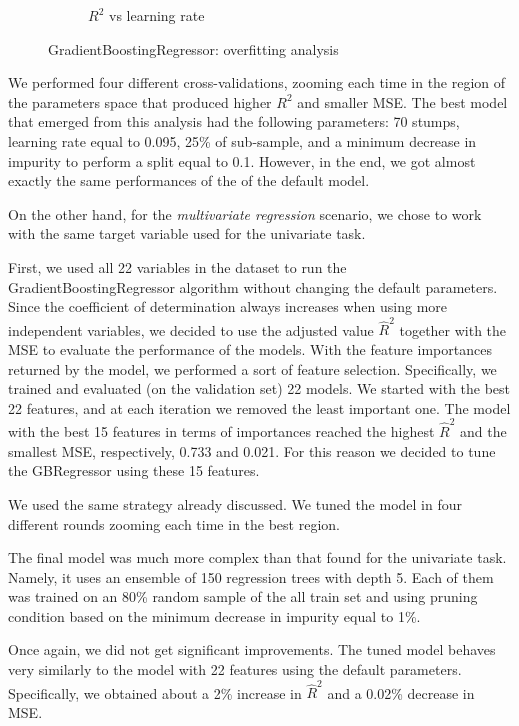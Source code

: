\documentclass[10pt, a4paper, twocolumn]{article}
\begin{document}
\begin{figure}[b]
\begin{subfigure}[t]{0.32\columnwidth}
        \caption{$R^2$ vs learning rate}
        \label{fig:R2_ga}
    \end{subfigure}
\caption{GradientBoostingRegressor: overfitting analysis}
\label{fig:gbregressor}
\end{figure}

We performed four different cross-validations, zooming each time in the region of the parameters space that produced higher $R^2$ and smaller MSE. The best model that emerged from this analysis had the following parameters: 70 stumps, learning rate equal to 0.095, 25\% of sub-sample, and a minimum decrease in impurity to perform a split equal to 0.1. However, in the end, we got almost exactly the same performances of the of the default model. 

On the other hand, for the \textit{multivariate regression} scenario, we chose to work with the same target variable used for the univariate task.

First, we used all 22 variables in the dataset to run the GradientBoostingRegressor algorithm without changing the default parameters. Since the coefficient of determination always increases when using more independent variables, we decided to use the adjusted value $\hat{R}^2$ together with the MSE to evaluate the performance of the models. With the feature importances returned by the model, we performed a sort of feature selection. Specifically, we trained and evaluated (on the validation set) 22 models. We started with the best 22 features, and at each iteration we removed the least important one. The model with the best 15 features in terms of importances reached the highest $\hat{R}^2$ and the smallest MSE, respectively, 0.733 and 0.021. For this reason we decided to tune the GBRegressor using these 15 features.

We used the same strategy already discussed. We tuned the model in four different rounds zooming each time in the best region. 

The final model was much more complex than that found for the univariate task. Namely, it uses an ensemble of 150 regression trees with depth 5. Each of them was trained on an 80\% random sample of the all train set and using pruning condition based on the minimum decrease in impurity equal to 1\%.

Once again, we did not get significant improvements. The tuned model behaves very similarly to the model with 22 features using the default parameters. Specifically, we obtained about a 2\% increase in $\hat{R}^2$ and a 0.02\% decrease in MSE.
\end{document}

